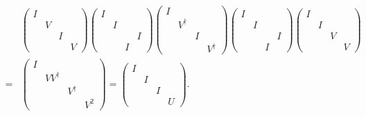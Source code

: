 \ex $$\begin{aligned}
    & \begin{pmatrix}
        I &   &   &   \\
        & V &   &   \\
        &   & I &   \\
        &   &   & V
    \end{pmatrix}\begin{pmatrix}
        I &   &   &   \\
        & I &   &   \\
        &   &   & I \\
        &   & I &  
    \end{pmatrix}\begin{pmatrix}
        I &           &   &   \\
        & V^\dagger &   &   \\
        &           & I &   \\
        &           &   & V^\dagger
    \end{pmatrix}\begin{pmatrix}
        I &   &   &   \\
        & I &   &   \\
        &   &   & I \\
        &   & I &  
    \end{pmatrix}\begin{pmatrix}
        I &   &   &   \\
        & I &   &   \\
        &   & V &   \\
        &   &   & V
    \end{pmatrix}
    \\ = & \begin{pmatrix}
        I &            &           &   \\
        & VV^\dagger &           &   \\
        &            & V^\dagger &   \\
        &            &           & V^2
    \end{pmatrix} = \begin{pmatrix}
        I &   &   &   \\
        & I &   &   \\
        &   & I &   \\
        &   &   & U
    \end{pmatrix}.
\end{aligned}$$

